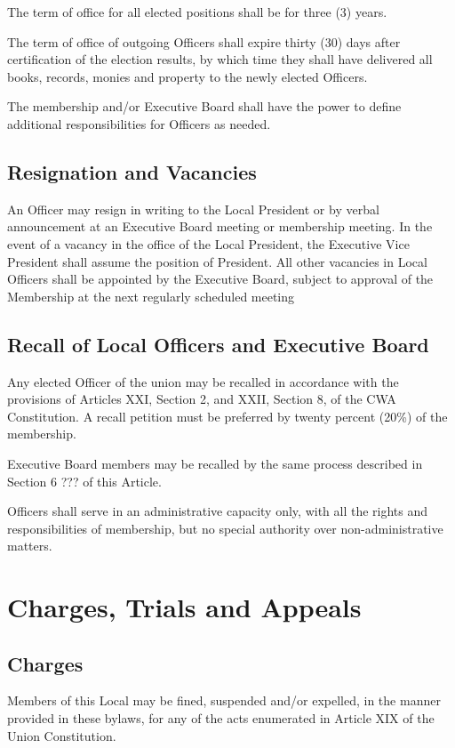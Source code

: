 \documentclass[12pt]{article}
\begin{document}
The term of office for all elected positions shall be for three (3) years.

The term of office of outgoing Officers shall expire thirty (30) days after certification of the election results, by which time they shall have delivered all books, records, monies and property to the newly elected Officers.

The membership and/or Executive Board shall have the power to define additional responsibilities for Officers as needed.

\subsection{Resignation and Vacancies}
An Officer may resign in writing to the Local President or by verbal announcement at an Executive Board meeting or membership meeting. In the event of a vacancy in the office of the Local President, the Executive Vice President shall assume the position of President. All other vacancies in Local Officers shall be appointed by the Executive Board, subject to approval of the Membership at the next regularly scheduled meeting

\subsection{Recall of Local Officers and Executive Board}
Any elected Officer of the union may be recalled in accordance with the provisions of Articles XXI, Section 2, and XXII, Section 8, of the CWA Constitution. A recall petition must be preferred by twenty percent (20\%) of the membership.

Executive Board members may be recalled by the same process described in Section 6 ??? of this Article.

Officers shall serve in an administrative capacity only, with all the rights and responsibilities of membership, but no special authority over non-administrative matters.

\section{Charges, Trials and Appeals}
\subsection{Charges}
Members of this Local may be fined, suspended and/or expelled, in the manner provided in these bylaws, for any of  the acts enumerated in Article XIX of the Union Constitution.
\end{document}
